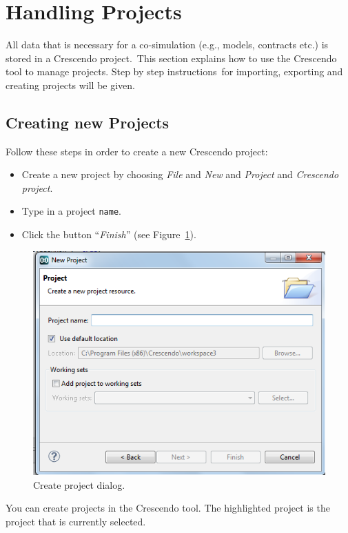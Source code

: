 \documentclass{crescendorepchap}
\begin{document}


\section{Handling Projects}

All data that is necessary for a co-simulation (e.g., models, contracts
etc.) is stored in a Crescendo project.~This section explains how to use
the Crescendo tool to manage projects. Step by step instructions~for
importing, exporting and creating projects will be given.

\subsection{Creating new Projects}

Follow these steps in order to create a new Crescendo project:

\begin{itemize}
\item
  Create a new project by choosing \emph{File} and \emph{New} and
  \emph{Project} and \emph{Crescendo project}.
\item
  Type in a project \texttt{name}.
\item
  Click the button ``\emph{Finish}'' (see Figure~\ref{fig:NewProject}).
\end{itemize}

\begin{figure}[htbp]
\centering
\includegraphics[width=.6\textwidth]{images/DestecsNewProject.png}
\caption{Create project dialog.\label{fig:NewProject}}
\end{figure}

You can create projects in the Crescendo tool. The highlighted project is
the project that is currently selected.
\end{document}
